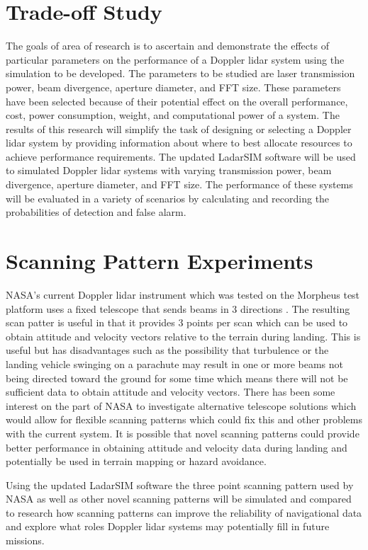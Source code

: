 \section{Trade-off Study}
The goals of area of research is to ascertain and demonstrate the effects
of particular parameters on the performance of a Doppler lidar system using
the simulation to be developed.
The parameters to be studied are laser transmission power, beam divergence,
aperture diameter, and FFT size.
These parameters have been selected because of their potential effect on
the overall performance, cost, power consumption, weight, and computational
power of a system.
The results of this research will simplify the task of designing or selecting
a Doppler lidar system by providing information about where to best allocate
resources to achieve performance requirements. The updated LadarSIM software
will be used to simulated Doppler lidar systems with varying transmission 
power, beam divergence, aperture diameter, and FFT size. The performance of 
these systems will be evaluated in a variety of scenarios by calculating and
recording the probabilities of detection and false alarm. 

\section{Scanning Pattern Experiments}
NASA's current Doppler lidar instrument which was tested on the Morpheus test 
platform uses a fixed telescope that sends beams in 3 directions \cite{amz12,amz12fiber,amz12p2,amz16coherent}.
The resulting scan patter is useful in that it provides 3 points per scan which can 
be used to obtain attitude and velocity vectors relative to the terrain during landing.
This is useful but has disadvantages such as the possibility that turbulence or 
the landing vehicle swinging on a parachute may result in one or more beams not
being directed toward the ground for some time which means there will not be sufficient
data to obtain attitude and velocity vectors. There has been some interest on the 
part of NASA to investigate alternative telescope solutions which would allow for 
flexible scanning patterns which could fix this and other problems with the current
system\cite{budge2016simulation}. It is possible that novel scanning patterns could
provide better performance in obtaining attitude and velocity data during landing and
potentially be used in terrain mapping or hazard avoidance. 

Using the updated LadarSIM software the three point scanning pattern used by NASA as
well as other novel scanning patterns will be simulated and compared to research how
scanning patterns can improve the reliability of navigational data and explore what 
roles Doppler lidar systems may potentially fill in future missions.  


